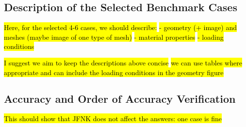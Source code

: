 \documentclass[sn-mathphys,Numbered]{sn-jnl}%
\begin{document}
\subsection{Description of the Selected Benchmark Cases}

\hl{Here, for the selected 4-6 cases, we should describe:}
\hl{- geometry (+ image) and meshes (maybe image of one type of mesh)}
\hl{- material properties}
\hl{- loading conditions}

\hl{I suggest we aim to keep the descriptions above concise}
\hl{we can use tables where appropriate and can include the loading conditions in the geometry figure}

\subsection{Accuracy and Order of Accuracy Verification}

\hl{This should show that JFNK does not affect the answers: one case is fine}
\end{document}
